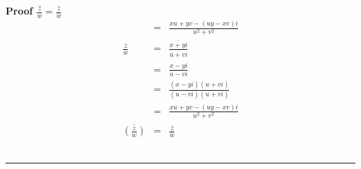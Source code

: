\documentclass{article}%
\newenvironment{proof}[1][]{\textbf{Proof #1} }{\ \rule{0.5em}{0.5em}}
\begin{document}
\begin{enumerate}
\begin{enumerate}[label*=\arabic*.]
\begin{enumerate}[label=\alph*]
\begin{proof}[$\overline{\frac{z}{w}}=\frac{\bar{z}}{\bar{w}}$]
\begin{eqnarray*}
                                            &=&\frac{xu+yv-(uy-xv)i}{u^2+v^2} \\
                    \frac{\bar{z}}{\bar{w}}&=&\frac{\overline{x+yi}}{\overline{u+vi}} \\
                                           &=&\frac{x-yi}{u-vi} \\
                                           &=&\frac{(x-yi)(u+vi)}{(u-vi)(u+vi)} \\
                                           &=&\frac{xu+yv-(uy-xv)i}{u^2+v^2} \\ 
                    \overline{(\frac{z}{w})}&=&\frac{\bar{z}}{\bar{w}}
                \end{eqnarray*}
            \end{proof}
        \end{enumerate}
    \end{enumerate}
\end{enumerate}
\end{document}

